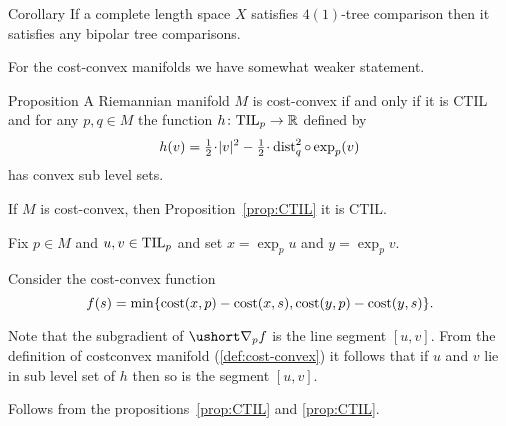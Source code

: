 \begin{thm}{Corollary}\label{cor:4(1)=>n(1)}
If a complete length space $X$ satisfies $4(1)$-tree comparison then it satisfies any bipolar tree comparisons.
\end{thm}

For the cost-convex manifolds we have somewhat weaker statement.

\begin{thm}{Proposition}\label{prop:convexity}
A Riemannian manifold $M$ is cost-convex if and only if it is CTIL and
for any $p,q\in M$ the function $h\colon \mathrm{\rm TIL}_p\to \mathbb{R}$ defined by
\[h(v)=\tfrac12\cdot|v|^2-\tfrac12\cdot\dist_q^2\circ\exp_p(v)\] 
has convex sub level sets.
\end{thm}

If $M$ is cost-convex, then Proposition~\ref{prop:CTIL} it is CTIL.

Fix $p\in M$ and $u,v\in \mathrm{\rm TIL}_p$
and set $x=\exp_pu$ and $y=\exp_pv$.

Consider the cost-convex function 
\[f(s)=\min\{\text{\rm cost}(x,p)-\text{\rm cost}(x,s),\text{\rm cost}(y,p)-\text{\rm cost}(y,s)\}.\]

Note that the subgradient of $\ushort\nabla_pf$ is the line segment $[u,v]$.
From the definition of costconvex manifold (\ref{def:cost-convex}) it follows that if $u$ and $v$ lie in sub level set of $h$ then so is the segment $[u,v]$.

 Follows from the propositions~\ref{prop:CTIL} and \ref{prop:CTIL}.
\qeds